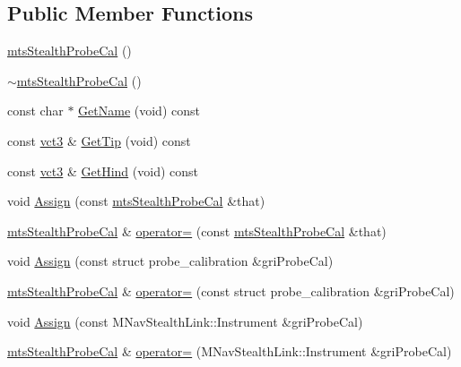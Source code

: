 \subsection*{Public Member Functions}
\begin{DoxyCompactItemize}
\item 
\hyperlink{classmts_stealth_probe_cal_a23a543dfab9d3e23f83078f7356c01c2}{mts\-Stealth\-Probe\-Cal} ()
\item 
\hyperlink{classmts_stealth_probe_cal_a7d648415188646162fde6fd4e7c198e2}{$\sim$mts\-Stealth\-Probe\-Cal} ()
\item 
const char $\ast$ \hyperlink{classmts_stealth_probe_cal_ac5d897e409c52bb39b0609be832b5280}{Get\-Name} (void) const 
\item 
const \hyperlink{vct_fixed_size_vector_types_8h_a3af82acdbf4eeb73c551909240b106ea}{vct3} \& \hyperlink{classmts_stealth_probe_cal_aef0ca077dd8812b6f8686216b649fc7e}{Get\-Tip} (void) const 
\item 
const \hyperlink{vct_fixed_size_vector_types_8h_a3af82acdbf4eeb73c551909240b106ea}{vct3} \& \hyperlink{classmts_stealth_probe_cal_abed5877dd697b53d5010c86b3c1637ec}{Get\-Hind} (void) const 
\item 
void \hyperlink{classmts_stealth_probe_cal_a1d42d1f6f752c03028a4880b1463d77d}{Assign} (const \hyperlink{classmts_stealth_probe_cal}{mts\-Stealth\-Probe\-Cal} \&that)
\item 
\hyperlink{classmts_stealth_probe_cal}{mts\-Stealth\-Probe\-Cal} \& \hyperlink{classmts_stealth_probe_cal_a72ee5ec4d3d020c08fac6d97b369fad6}{operator=} (const \hyperlink{classmts_stealth_probe_cal}{mts\-Stealth\-Probe\-Cal} \&that)
\item 
void \hyperlink{classmts_stealth_probe_cal_a40d6ebfc91323afd2a504d03f82542d1}{Assign} (const struct probe\-\_\-calibration \&gri\-Probe\-Cal)
\item 
\hyperlink{classmts_stealth_probe_cal}{mts\-Stealth\-Probe\-Cal} \& \hyperlink{classmts_stealth_probe_cal_a01847095e7208b7ca2285e0530afbfed}{operator=} (const struct probe\-\_\-calibration \&gri\-Probe\-Cal)
\item 
void \hyperlink{classmts_stealth_probe_cal_a4556d8cf2d9ecf50ed462b182abb31cc}{Assign} (const M\-Nav\-Stealth\-Link\-::\-Instrument \&gri\-Probe\-Cal)
\item 
\hyperlink{classmts_stealth_probe_cal}{mts\-Stealth\-Probe\-Cal} \& \hyperlink{classmts_stealth_probe_cal_aa2917c905dce23705b3efc6c925b1d94}{operator=} (M\-Nav\-Stealth\-Link\-::\-Instrument \&gri\-Probe\-Cal)
\item 

\end{DoxyCompactItemize}
